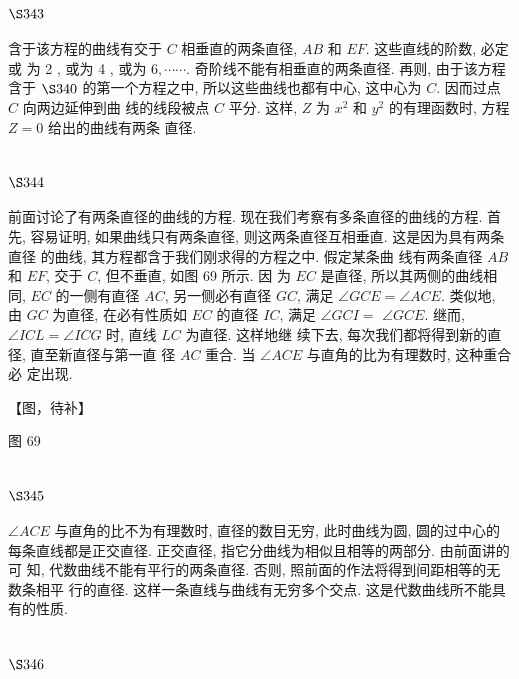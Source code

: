 \section{$\S 343$}

含于该方程的曲线有交于 $C$ 相垂直的两条直径, $A B$ 和 $E F$. 这些直线的阶数, 必定或 为 2 , 或为 4 , 或为 $6, \cdots \cdots$. 奇阶线不能有相垂直的两条直径. 再则, 由于该方程含于 $\S 340$ 的第一个方程之中, 所以这些曲线也都有中心, 这中心为 $C$. 因而过点 $C$ 向两边延伸到曲 线的线段被点 $C$ 平分. 这样, $Z$ 为 $x^{2}$ 和 $y^{2}$ 的有理函数时, 方程 $Z=0$ 给出的曲线有两条 直径.

\section{$\S 344$}

前面讨论了有两条直径的曲线的方程. 现在我们考察有多条直径的曲线的方程. 首 先, 容易证明, 如果曲线只有两条直径, 则这两条直径互相垂直. 这是因为具有两条直径 的曲线, 其方程都含于我们刚求得的方程之中. 假定某条曲 线有两条直径 $A B$ 和 $E F$, 交于 $C$, 但不垂直, 如图 69 所示. 因 为 $E C$ 是直径, 所以其两侧的曲线相同, $E C$ 的一侧有直径 $A C$, 另一侧必有直径 $G C$, 满足 $\angle G C E=\angle A C E$. 类似地, 由 $G C$ 为直径, 在必有性质如 $E C$ 的直径 $I C$, 满足 $\angle G C I=$ $\angle G C E$. 继而, $\angle I C L=\angle I C G$ 时, 直线 $L C$ 为直径. 这样地继 续下去, 每次我们都将得到新的直径, 直至新直径与第一直 径 $A C$ 重合. 当 $\angle A C E$ 与直角的比为有理数时, 这种重合必 定出现.


【图，待补】

图 69

\section{$\S 345$}

$\angle A C E$ 与直角的比不为有理数时, 直径的数目无穷, 此时曲线为圆, 圆的过中心的 每条直线都是正交直径. 正交直径, 指它分曲线为相似且相等的两部分. 由前面讲的可 知, 代数曲线不能有平行的两条直径. 否则, 照前面的作法将得到间距相等的无数条相平 行的直径. 这样一条直线与曲线有无穷多个交点. 这是代数曲线所不能具有的性质.

\section{$\S 346$}

